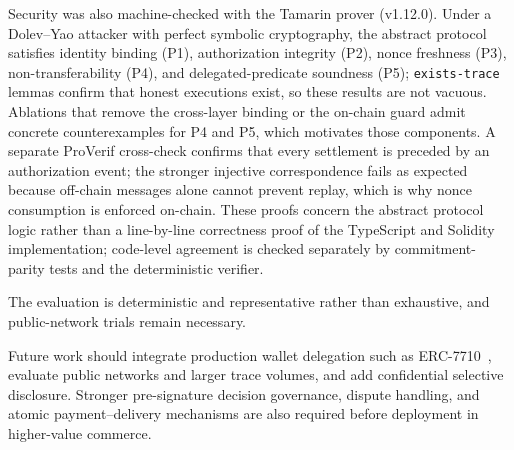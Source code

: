 
Security was also machine-checked with the Tamarin prover (v1.12.0). Under a Dolev--Yao attacker with perfect symbolic cryptography, the abstract protocol satisfies identity binding (P1), authorization integrity (P2), nonce freshness (P3), non-transferability (P4), and delegated-predicate soundness (P5); \texttt{exists-trace} lemmas confirm that honest executions exist, so these results are not vacuous. Ablations that remove the cross-layer binding or the on-chain guard admit concrete counterexamples for P4 and P5, which motivates those components. A separate ProVerif cross-check confirms that every settlement is preceded by an authorization event; the stronger injective correspondence fails as expected because off-chain messages alone cannot prevent replay, which is why nonce consumption is enforced on-chain. These proofs concern the abstract protocol logic rather than a line-by-line correctness proof of the TypeScript and Solidity implementation; code-level agreement is checked separately by commitment-parity tests and the deterministic verifier.

The evaluation is deterministic and representative rather than exhaustive, and public-network trials remain necessary.

Future work should integrate production wallet delegation such as ERC-7710~\cite{erc7710}, evaluate public networks and larger trace volumes, and add confidential selective disclosure. Stronger pre-signature decision governance, dispute handling, and atomic payment--delivery mechanisms are also required before deployment in higher-value commerce.
